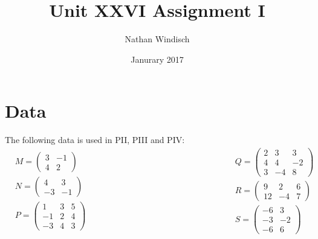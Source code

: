 \documentclass[a4paper,10pt]{article}
\begin{document}
\pgfplotsset{compat=1.14}
\title{Unit XXVI Assignment I}
\author{Nathan Windisch}
\date{Janurary 2017}
\maketitle
{}
\newpage
\tableofcontents
\newpage

  \section{Data}
    The following data is used in PII, PIII and PIV:
    \begin{equation*}
      \begin{split}
        &M =
        \begin{pmatrix}
          3 & -1\\
          4 &  2
        \end{pmatrix}
        \\
        &N =
        \begin{pmatrix}
           4 &  3\\
          -3 & -1
        \end{pmatrix}
        \\
        &P =
        \begin{pmatrix}
           1 & 3 & 5\\
          -1 & 2 & 4\\
          -3 & 4 & 3
        \end{pmatrix}
      \end{split}
      \qquad
      \qquad
      \qquad
      \qquad
      \qquad
      \qquad
      \qquad
      \qquad
      \begin{split}
        &Q =
        \begin{pmatrix}
          2 &  3 &  3\\
          4 &  4 & -2\\
          3 & -4 &  8
        \end{pmatrix}
        \\
        &R =
        \begin{pmatrix}
          9 &  2 & 6\\
          12 & -4 & 7
        \end{pmatrix}
        \\
        &S =
        \begin{pmatrix}
          -6 &  3\\
          -3 & -2\\
          -6 &  6
        \end{pmatrix}
      \end{split}
    \end{equation*}
\end{document}
